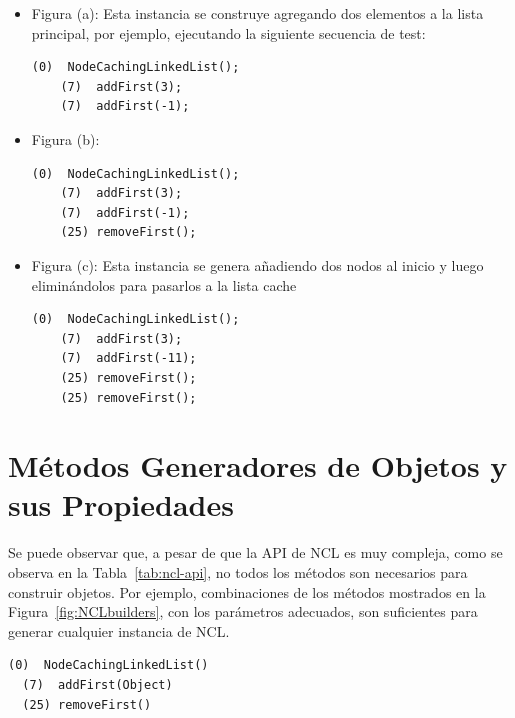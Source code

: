 \begin{itemize}
\item Figura (a): Esta instancia se construye agregando dos elementos a la lista
    principal, por ejemplo, ejecutando la siguiente secuencia de test:
\vspace{5pt} 
    \begin{lstlisting}[numbers=none,label=fig:NCLbuilders_a,xleftmargin=0pt]
    (0)  NodeCachingLinkedList();
    (7)  addFirst(3);
    (7)  addFirst(-1);
    \end{lstlisting}

\item Figura (b):
    \vspace{5pt} 

    \begin{lstlisting}[numbers=none,label=fig:NCLbuilders_b, xleftmargin=0pt]
    (0)  NodeCachingLinkedList();
    (7)  addFirst(3);
    (7)  addFirst(-1);
    (25) removeFirst();
    \end{lstlisting}

\item Figura (c): 
    Esta instancia se genera añadiendo dos nodos al inicio y luego eliminándolos
    para pasarlos a la lista cache
    \vspace{5pt} 

    \begin{lstlisting}[numbers=none,label=fig:NCLbuilders_c, xleftmargin=0pt]
    (0)  NodeCachingLinkedList();
    (7)  addFirst(3); 
    (7)  addFirst(-11); 
    (25) removeFirst();
    (25) removeFirst();
    \end{lstlisting}
\end{itemize}



\section{Métodos Generadores de Objetos y sus Propiedades}

Se puede observar que, a pesar de que la API de NCL es muy compleja, como se observa en la Tabla~\ref{tab:ncl-api}, no todos los métodos son necesarios para construir objetos. 
Por ejemplo, combinaciones de los métodos mostrados en la Figura~\ref{fig:NCLbuilders}, con los parámetros adecuados, son suficientes para generar cualquier instancia de NCL.
\vspace{5pt} 
\begin{lstlisting}[numbers=none,label=fig:NCLbuilders, caption=Conjunto de métodos generadores de objetos para NCL]
  (0)  NodeCachingLinkedList()
  (7)  addFirst(Object)
  (25) removeFirst()
\end{lstlisting}

